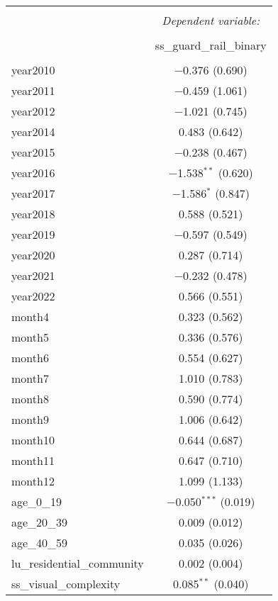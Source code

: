 \begin{table}[!htbp] \centering 
  \caption{} 
  \label{} 
\small 
\begin{tabular}{@{\extracolsep{1pt}}lc} 
\\[-1.8ex]\hline 
\hline \\[-1.8ex] 
 & \multicolumn{1}{c}{\textit{Dependent variable:}} \\ 
\cline{2-2} 
\\[-1.8ex] & ss\_guard\_rail\_binary \\ 
\hline \\[-1.8ex] 
 year2010 & $-$0.376 (0.690) \\ 
  year2011 & $-$0.459 (1.061) \\ 
  year2012 & $-$1.021 (0.745) \\ 
  year2014 & 0.483 (0.642) \\ 
  year2015 & $-$0.238 (0.467) \\ 
  year2016 & $-$1.538$^{**}$ (0.620) \\ 
  year2017 & $-$1.586$^{*}$ (0.847) \\ 
  year2018 & 0.588 (0.521) \\ 
  year2019 & $-$0.597 (0.549) \\ 
  year2020 & 0.287 (0.714) \\ 
  year2021 & $-$0.232 (0.478) \\ 
  year2022 & 0.566 (0.551) \\ 
  month4 & 0.323 (0.562) \\ 
  month5 & 0.336 (0.576) \\ 
  month6 & 0.554 (0.627) \\ 
  month7 & 1.010 (0.783) \\ 
  month8 & 0.590 (0.774) \\ 
  month9 & 1.006 (0.642) \\ 
  month10 & 0.644 (0.687) \\ 
  month11 & 0.647 (0.710) \\ 
  month12 & 1.099 (1.133) \\ 
  age\_0\_19 & $-$0.050$^{***}$ (0.019) \\ 
  age\_20\_39 & 0.009 (0.012) \\ 
  age\_40\_59 & 0.035 (0.026) \\ 
  lu\_residential\_community & 0.002 (0.004) \\ 
  ss\_visual\_complexity & 0.085$^{**}$ (0.040) \\ 

\end{tabular}
\end{table}

